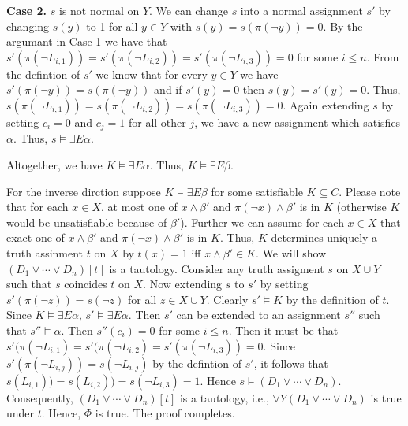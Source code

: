 \documentclass[12pt]{article}
\begin{document}
{\bf Case 2.}  $s$ is not normal on $Y$. We can change $s$ into a normal assignment $s'$ by changing $s(y)$ to 1 for all $y\in Y$ with $s(y)=s(\pi(\neg y))=0$. 
By the argumant in Case 1 we have that $s'(\pi(\neg L_{i,1}))=s'(\pi(\neg L_{i,2}))=s'(\pi(\neg L_{i,3}))=0$ for some $i\leq n$. From the defintion of $s'$ we know that for every $y\in Y$ we have $s'(\pi(\neg y))=s(\pi(\neg y))$ and if $s'(y)=0$ then $s(y)=s'(y)=0$. Thus, $s(\pi(\neg L_{i,1}))=s(\pi(\neg L_{i,2}))=s(\pi(\neg L_{i,3}))=0$. Again extending $s$ by setting $c_i=0$ and $c_j=1$ for all other $j$, we have a new assignment which satisfies $\alpha$. Thus, $s\models\exists E\alpha$. 

Altogether, we have
$K\models\exists E\alpha$. Thus, $K\models\exists E\beta$. 


For the inverse dirction suppose $K\models \exists E\beta$ for some satisfiable $K\subseteq C$. Please note that for each $x\in X$, at most one of $x\wedge \beta'$ and $\pi(\neg x)\wedge\beta'$ is in $K$ (otherwise $K$ would be unsatisfiable because of $\beta'$). 
Further we can assume for each $x\in X$ that exact one of $x\wedge \beta'$ and $\pi(\neg x)\wedge\beta'$ is in $K$. Thus, $K$ determines uniquely a truth assinment $t$ on $X$ by $t(x)=1$ iff $x\wedge \beta'\in K$. We will show $(D_1\vee\cdots\vee D_n)[t]$ is a tautology. Consider any truth assigment $s$ on $X\cup Y$ such that $s$ coincides $t$ on $X$. Now extending $s$ to $s'$ by setting $s'(\pi(\neg z))=s(\neg z)$ for all $z\in X\cup Y$. Clearly $s'\models K$ by the definition of $t$. 
Since $K\models\exists E\alpha$, $s'\models \exists E\alpha$. 
Then $s'$ can be extended to an assignment $s''$ such that $s''\models \alpha$. Then $s''(c_i)=0$ for some $i\leq n$. 
Then it must be that $s'(\pi(\neg L_{i,1})=s'(\pi(\neg L_{i,2})=s'(\pi(\neg L_{i,3}))=0$. Since $s'(\pi(\neg L_{i,j}))=s(\neg L_{i,j})$ by the defintion of $s'$, it follows that $s(L_{i,1}))=s( L_{i,2}))=s(\neg L_{i,3})=1$. Hence $s\models  (D_1\vee\cdots\vee D_n)$. Consequently, $(D_1\vee\cdots\vee D_n)[t]$ is a tautology, i.e., $\forall Y(D_1\vee\cdots\vee D_n)$ is true under $t$. Hence, $\Phi$ is true. The proof completes.
\end{document}
